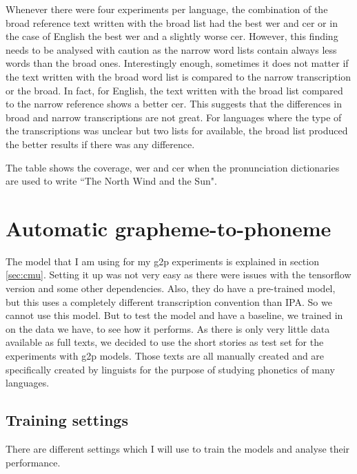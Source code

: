 Whenever there were four experiments per language, the combination of the broad reference text written with the broad list had the best \ac{wer} and \ac{cer} or in the case of English the best \ac{wer} and a slightly worse \ac{cer}. However, this finding needs to be analysed with caution as the narrow word lists contain always less words than the broad ones. Interestingly enough, sometimes it does not matter if the text written with the broad word list is compared to the narrow transcription or the broad. In fact, for English, the text written with the broad list compared to the narrow reference shows a better \ac{cer}. This suggests that the differences in broad and narrow transcriptions are not great.
For languages where the type of the transcriptions was unclear but two lists for available, the broad list produced the better results if there was any difference. 



\begin{table}[h!]
\begin{center}
\caption[Coverage of Pronunciation Dictionaries]{The table shows the coverage, \ac{wer} and \ac{cer} when the pronunciation dictionaries are used to write ``The North Wind and the Sun".}
\label{tab:coverage}
\end{center}
\end{table}

\section{Automatic grapheme-to-phoneme}
The model that I am using for my \ac{g2p} experiments is explained in section \ref{sec:cmu}. Setting it up was not very easy as there were issues with the tensorflow version and some other dependencies. Also, they do have a pre-trained model, but this uses a completely different transcription convention than IPA. So we cannot use this model. But to test the model and have a baseline, we trained in on the data we have, to see how it performs. As there is only very little data available as full texts, we decided to use the short stories as test set for the experiments with \ac{g2p} models. Those texts are all manually created and are specifically created by linguists for the purpose of studying phonetics of many languages. 

\subsection{Training settings}
There are different settings which I will use to train the models and analyse their performance.


